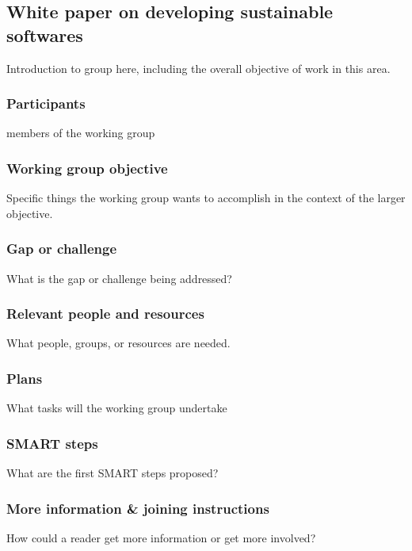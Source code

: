 \subsection{White paper on developing sustainable softwares}
\label{sec:best-practices-developing}


Introduction to group here, including the overall objective of work in this area.

\subsubsection{Participants}

members of the working group

\subsubsection{Working group objective}

Specific things the working group wants to accomplish in the context of the larger objective.

\subsubsection{Gap or challenge}

What is the gap or challenge being addressed?

\subsubsection{Relevant people and resources}

What people, groups, or resources are needed.

\subsubsection{Plans}

What tasks will the working group undertake

\subsubsection{SMART steps}

What are the first SMART steps proposed?

\subsubsection{More information \& joining instructions}

How could a reader get more information or get more involved?